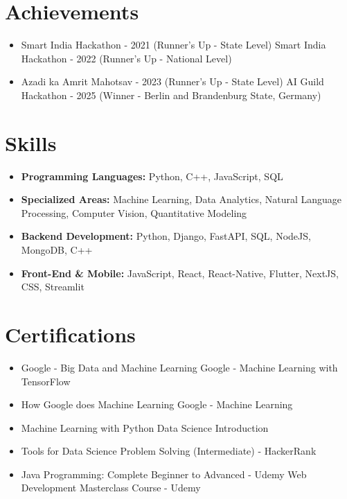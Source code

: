 \documentclass[a4paper,10pt]{article}
\begin{document}
\section*{Achievements}
\begin{itemize}
\item Smart India Hackathon - 2021 (Runner's Up - State Level) \hfill Smart India Hackathon - 2022 (Runner's Up - National Level)
\item Azadi ka Amrit Mahotsav - 2023 (Runner's Up - State Level) \hfill AI Guild Hackathon - 2025 (Winner - Berlin and Brandenburg State, Germany)
\end{itemize}

\section*{Skills}
\begin{itemize}
  \item \textbf{Programming Languages:} Python, C++, JavaScript, SQL
  \item \textbf{Specialized Areas:} Machine Learning, Data Analytics, Natural Language Processing, Computer Vision, Quantitative Modeling
  \item \textbf{Backend Development:} Python, Django, FastAPI, SQL, NodeJS, MongoDB, C++
  \item \textbf{Front-End \& Mobile:} JavaScript, React, React-Native, Flutter, NextJS, CSS, Streamlit
\end{itemize}

\section*{Certifications}
\begin{itemize}
\item Google - Big Data and Machine Learning \hfill Google - Machine Learning with TensorFlow
\item How Google does Machine Learning \hfill Google - Machine Learning
\item Machine Learning with Python \hfill Data Science Introduction
\item Tools for Data Science \hfill Problem Solving (Intermediate) - HackerRank
\item Java Programming: Complete Beginner to Advanced - Udemy \hfill Web Development Masterclass Course - Udemy
\end{itemize}
\end{document}

